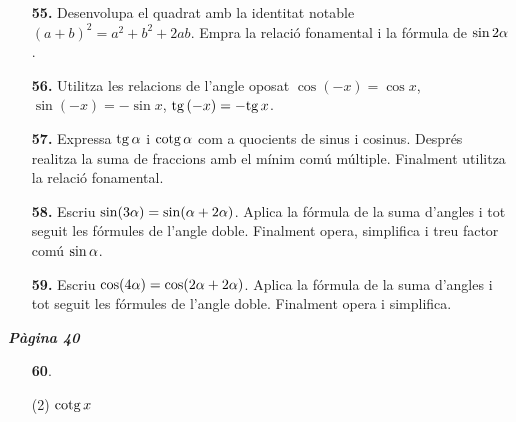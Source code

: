 \documentclass[a4paper, pdf, twoside]{book}
\begin{document}
\begin{multicols}{2}
\begin{enumerate}
\vspace{0.25cm}
\item[\fontfamily{phv}\selectfont\color{blue}\textbf{55. }]  \scalebox{0.6}{\simbolcompass } 
Desenvolupa el quadrat amb la identitat notable $(a+b)^2 = a^2 + b^2 + 2ab$. Empra la relació fonamental i la fórmula de $\sin 2\alpha $.
\vspace{0.25cm}
\item[\fontfamily{phv}\selectfont\color{blue}\textbf{56. }]  \scalebox{0.6}{\simbolcompass } 
Utilitza les relacions de l'angle oposat $\cos (-x)=\cos x$, $\sin (-x)=-\sin x$, $\mathrm{tg}\, (-x)=-\mathrm{tg}\, x$.
\vspace{0.25cm}
\item[\fontfamily{phv}\selectfont\color{blue}\textbf{57. }]  \scalebox{0.6}{\simbolcompass } 
Expressa $\mathrm{tg}\, \alpha $ i $\mathrm{cotg}\, \alpha $ com a quocients de sinus i cosinus. Després realitza la suma de fraccions amb el mínim comú múltiple. Finalment utilitza la relació fonamental.
\vspace{0.25cm}
\item[\fontfamily{phv}\selectfont\color{blue}\textbf{58. }]  \scalebox{0.6}{\simbolcompass } 
Escriu $\sin (3\alpha ) = \sin (\alpha +2\alpha )$. Aplica la fórmula de la suma d'angles i tot seguit les fórmules de l'angle doble. Finalment opera, simplifica i treu factor comú $\sin \alpha $.
\vspace{0.25cm}
\item[\fontfamily{phv}\selectfont\color{blue}\textbf{59. }]  \scalebox{0.6}{\simbolcompass } 
Escriu $\cos (4\alpha ) = \cos (2\alpha +2\alpha )$. Aplica la fórmula de la suma d'angles i tot seguit les fórmules de l'angle doble. Finalment opera i simplifica.
 \end{enumerate}
\vspace{0.3cm}


{\textbf{\em Pàgina 40}} \hrulefill
\begin{enumerate}
\vspace{0.25cm}



 \item[\fontfamily{phv}\selectfont\color{blue}\textbf{60}. ] 
 \begin{tasks}[column-sep=1em, item-indent=1.3333em](2)
	 \task $\mathrm{cotg}\, x$
\end{tasks}
 \end{enumerate}
\begin{enumerate}
\vspace{0.25cm}



\end{enumerate}
\end{multicols}
\end{document}
